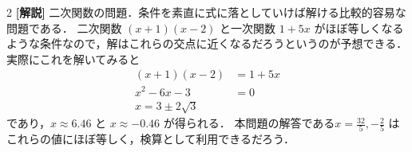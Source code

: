 \documentclass[../../main.tex]{subfiles}
\begin{document}
\begin{multicols}{2}
    {\bf[解説]}
    二次関数の問題．条件を素直に式に落としていけば解ける比較的容易な問題である．
    二次関数 $(x+1)(x-2)$ と一次関数 $1+5x$ がほぼ等しくなるような条件なので，解はこれらの交点に近くなるだろうというのが予想できる．
    実際にこれを解いてみると
    \begin{align*}
        (x+1)(x-2)   & = 1 + 5x \\
        x^2 - 6x - 3 & = 0      \\
        x = 3 \pm 2\sqrt{3}
    \end{align*}
    であり，$x \approx 6.46$ と $x \approx -0.46$ が得られる．
    本問題の解答である$x = \frac{32}{5}, -\frac{2}{5}$ はこれらの値にほぼ等しく，検算として利用できるだろう．

    \newpage
\end{multicols}
\end{document}
